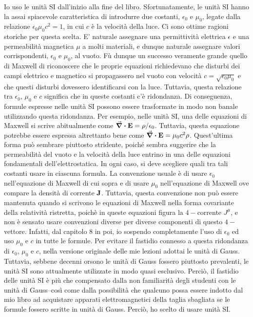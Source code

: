 Io uso le unità SI dall'inizio alla fine del libro. Sfortunatamente, le unità SI hanno la assai spiacevole caratteristica di introdurre due costanti, $\epsilon_0$ e $\mu_0$, legate dalla relazione $\epsilon_0 \mu_0 c^2 = 1$, in cui $c$ è la velocità della luce. Ci sono ottime ragioni storiche per questa scelta. E' naturale assegnare una permittività elettrica $\epsilon$ e una permeabilità magnetica $\mu$ a molti materiali, e dunque naturale assegnare valori corrispondenti, $\epsilon_0$ e $\mu_0$, al vuoto. Fù dunque un successo veramente grande quello di Maxwell di riconoscere che le proprie equazioni richiedevano che disturbi dei campi elettrico e magnetico si propagassero nel vuoto con velocità $c=\sqrt{\epsilon_0 \mu_0}$  e che questi disturbi dovessero identificarsi con la luce. Tuttavia, questa relazione tra $\epsilon_0$, $\mu_0$ e $c$ significa che in queste costanti c'è ridondanza. Di conseguenza, formule espresse nelle unità SI possono essere trasformate in modo non banale utilizzando questa ridondanza. Per esempio, nelle unità SI, una delle equazioni di Maxwell si scrive abitualmente come $\div{\vb{E}} = \rho / \epsilon_0 $. Tuttavia, questa equazione potrebbe essere espressa altrettanto bene come  $\div{\vb{E}} = \mu_0 c^2 \rho$. Quest'ultima forma può sembrare piuttosto stridente, poiché sembra suggerire che la permeabilità del vuoto e la velocità della luce entrino in una delle equazioni fondamentali dell'elettrostatica. In ogni caso, si deve scegliere quali tra tali costanti usare in ciascuna formula. La convenzione usuale è di usare $\epsilon_0$ nell'equazione di Maxwell di cui sopra e di usare $\mu_0$ nell'equazione di Maxwell ove compare la densità di corrente $\vb{J}$. Tuttavia, questa convenzione non può essere mantenuta quando si scrivono le equazioni di Maxwell nella forma covariante della relatività ristretta, poichè in queste equazioni figura la $4-$corrente $J^{\mu}$, e non è sensato usare convenzioni diverse per diverse componenti di questo $4-$vettore. Infatti, dal capitolo 8 in poi, io sospendo completamente l'uso di $\epsilon_0$ ed uso $\mu_0$  e $c$ in tutte le formule. Per evitare il fastidio connesso a questa ridondanza di $\epsilon_0$, $\mu_0$ e $c$, nella versione originale delle mie lezioni adottai le unità di Gauss. Tuttavia, sebbene decenni orsono le unità di Gauss fossero piuttosto prevalenti, le unità SI sono attualmente utilizzate in modo quasi esclusivo. Perciò, il fastidio delle unità SI è più che compensato dalla non familiarità degli studenti con le unità di Gauss--così come dalla possibilità che qualcuno possa essere indotto dal mio libro ad acquistare apparati elettromagnetici della taglia sbagliata se le formule fossero scritte in unità di Gauss. Perciò, ho scelto di usare unità SI. 

